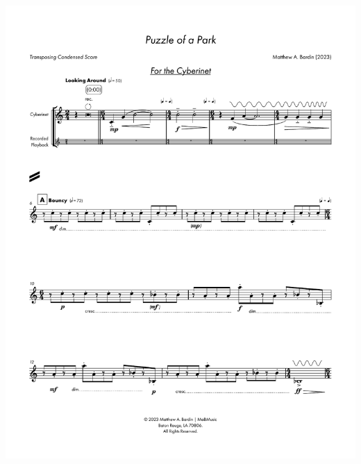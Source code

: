    \begin{center}
    \includegraphics[scale=0.75]{Scores/puzzlePart6.pdf}
    \end{center}
    \newpage
